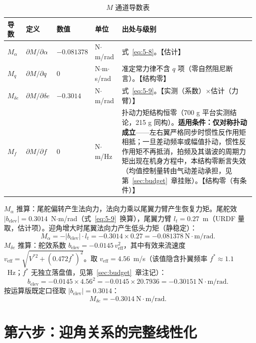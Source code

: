\documentclass[11pt,a4paper]{ctexart}
\begin{document}
\begin{table}[htbp]
\centering\small
\begin{tabularx}{\textwidth}{llllX}
\toprule
导数 & 定义 & 数值 & 单位 & 出处与级别 \\
\midrule
$M_\alpha$ & $\partial M/\partial\alpha$ & $-0.081378$ & N$\cdot$m/rad & 式~\eqref{eq:5-8}。【估计】 \\
$M_q$ & $\partial M/\partial q$ & $0$ & N$\cdot$m$\cdot$s/rad & 准定常力律不含 $q$ 项（零自然阻尼断言）。【结构零】 \\
$M_{\delta e}$ & $\partial M/\partial\delta e$ & $-0.3014$ & N$\cdot$m/rad & 式~\eqref{eq:5-9}。【实测（系数）$\times$估计（力臂）】 \\
$M_f$ & $\partial M/\partial f$ & $0$ & N$\cdot$m/Hz & 扑动力矩结构恒零（700 g 平台实测结论，215 g 同构）。\textbf{适用条件：仅对称扑动成立}——左右翼严格同步时惯性反作用矩相抵；一旦差动频率或幅值扑动，惯性反作用矩不再抵消，拍频及其谐波的周期力矩出现在机身方程中，本结构零断言失效（均值控制量转由气动差动承担，见第~\ref{sec:budget}~章挂账）。【结构零（有条件）】 \\
\bottomrule
\end{tabularx}
\caption{$M$ 通道导数表}
\end{table}

$M_\alpha$ 推算：尾舵偏转产生法向力，法向力乘以尾翼力臂产生恢复力矩。尾舵效 $|b_{\mathrm{elev}}|=0.3014$~N$\cdot$m/rad（式~\eqref{eq:5-9}~换算），尾翼力臂 $l_t=0.27$~m（URDF 量取，估计项）。迎角增大时尾翼法向力产生低头力矩（静稳定）：
\begin{equation}\label{eq:5-8}
M_\alpha = -|b_{\mathrm{elev}}|\cdot l_t = -0.3014\times 0.27 = -0.081378\ \mathrm{N\cdot m/rad}.
\tag{(5-8)}
\end{equation}
$M_{\delta e}$ 推算：舵效系数 $b_{\mathrm{elev}}=-0.0145\,v_{\mathrm{eff}}^2$，其中有效来流速度 $v_{\mathrm{eff}}=\sqrt{V^{*2}+(0.472 f^{*})^2}$。取 $v_{\mathrm{eff}}=4.56$~m/s（该值隐含扑翼频率 $f^{*}\approx 1.1$~Hz；$f^{*}$ 无独立落盘值，见第~\ref{sec:budget}~章注记）：
\[
b_{\mathrm{elev}} = -0.0145\times 4.56^2 = -0.0145\times 20.7936 = -0.30151\ \mathrm{N\cdot m/rad}.
\]
按运算版既定口径取 $|b_{\mathrm{elev}}|=0.3014$：
\begin{equation}\label{eq:5-9}
M_{\delta e} = -0.3014\ \mathrm{N\cdot m/rad}.
\tag{(5-9)}
\end{equation}

\section{第六步：迎角关系的完整线性化}\label{sec:aoa}
\end{document}
